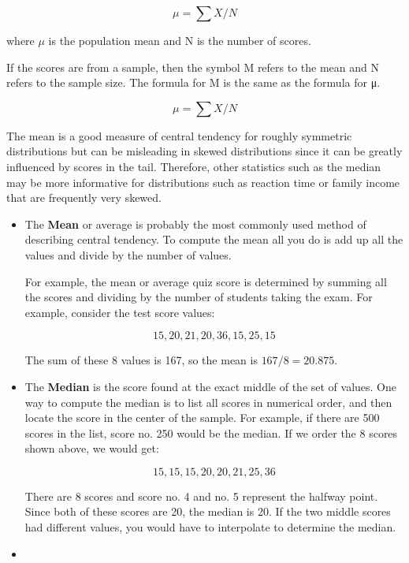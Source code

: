 \documentclass[]{report}
\begin{document}
\[\mu = \sum X/N\]

where $\mu$ is the population mean and N is the number of scores. 

If the scores are from a sample, then the symbol M refers to the mean and N refers to the sample size. The formula for M is the same as the formula for
μ. 

\[\mu = \sum X/N\]

The mean is a good measure of central tendency for roughly symmetric distributions but can be misleading in skewed distributions since it can be greatly influenced by scores in the tail. Therefore, other statistics such as the median may be more informative for distributions such as reaction time or family income that are frequently very skewed.


\begin{itemize}

\item The \textbf{Mean} or average is probably the most commonly used method of describing central 
tendency. To compute the mean all you do is add up all the values and divide by the number of values.

For example, the mean or average quiz score is determined by summing all the scores and dividing by the number of students taking the exam. For example, consider the test score values:

\[15, 20, 21, 20, 36, 15, 25, 15\]

The sum of these 8 values is 167, so the mean is $167/8 = 20.875$.

\item The \textbf{Median} is the score found at the exact middle of the set of values. One way to compute the median is to list all scores in numerical order, and then locate the score in the center of the sample. For example, if there are 500 scores in the list, score no. 250 would be the median. If we order the 8 scores shown above, we would get:

\[15,15,15,20,20,21,25,36\]

There are 8 scores and score no. 4 and no. 5 represent the halfway point. Since both of these scores are 20, the median is 20. If the two middle scores had different values, you would have to interpolate to determine the median.


\item 
\end{itemize}
\end{document}

